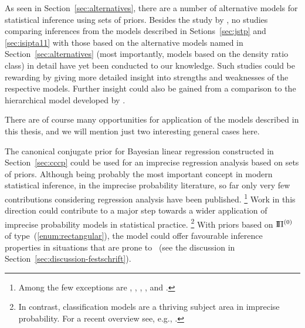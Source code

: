 As seen in Section~\ref{sec:alternatives}, there are a number of alternative models
for statistical inference using sets of priors.
Besides the study by \textcite{2011:krautenbacher},
no studies comparing inferences from the models described in Setions~\ref{sec:jstp} and \ref{sec:isipta11}
with those based on the alternative models named in Section~\ref{sec:alternatives}
(most importantly, models based on the density ratio class)
in detail have yet been conducted to our knowledge.
Such studies could be rewarding
by giving more detailed insight into strengths and weaknesses of the respective models.
Further insight could also be gained from a comparison to the hierarchical model
developed by \textcite[see Section~\ref{sec:hierarchical}]{2008:cattaneo}.

There are of course many opportunities for application of the models described in this thesis,
and we will mention just two interesting general cases here.

The canonical conjugate prior for Bayesian linear regression constructed in Section~\ref{sec:cccp}
could be used for an imprecise regression analysis based on sets of priors.
Although being probably the most important concept in modern statistical inference,
in the imprecise probability literature,
so far only very few contributions considering regression analysis have been published.%
\footnote{Among the few exceptions are \textcite{Walter2007a}, \textcite{2010:utkin},
\textcite{2011:utkin}, \textcite{2012:cattaneo-wiencierz}, and \textcite{2013:utkin-wiencierz}.}
Work in this direction could contribute to a major step towards a wider application
of imprecise probability models in statistical practice.%
\footnote{In contrast, classification models are a thriving subject area in imprecise probability.
For a recent overview see, e.g., \textcite{itip-classification}.}
With priors based on $\text{I}\!\Pi^{(0)}$ of type~(\ref{enum:rectangular}),
the model could offer favourable inference properties in situations that are prone to \pdc\
(see the discussion in Section~\ref{sec:discussion-festschrift}).

